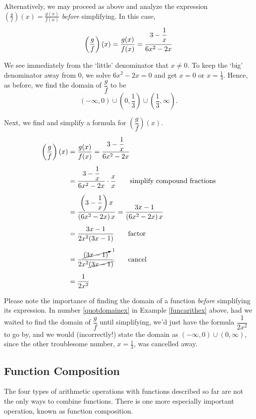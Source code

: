 {\begin{enumerate}
Alternatively, we may proceed as above and analyze the expression $\left(\frac{g}{f}\right)(x) = \frac{g(x)}{f(x)}$ \textit{before} simplifying.  In this case, \[ \left(\dfrac{g}{f}\right)(x) = \dfrac{g(x)}{f(x)}  = \dfrac{3-\dfrac{1}{x}\vphantom{\left(\dfrac{1}{x}\right)}}{6x^2 - 2x}\]

We see immediately from the `little' denominator that $x \neq 0$.  To keep the `big' denominator away from $0$, we solve $6x^2 - 2x = 0$ and get $x = 0$ or $x = \frac{1}{3}$.  Hence, as before, we find the domain of $\dfrac{g}{f}$ to be 
\[
(-\infty, 0) \cup \left(0, \frac{1}{3}\right) \cup \left(\frac{1}{3}, \infty\right).
\]

Next, we find and simplify a formula for $\left(\dfrac{g}{f}\right)(x)$.

\begin{align*} 
\left( \dfrac{g}{f}\right)(x) & = \dfrac{g(x)}{f(x)} = \dfrac{3-\dfrac{1}{x}}{6x^2 - 2x} \\[5pt]
& = \dfrac{3-\dfrac{1}{x}}{6x^2 - 2x} \cdot \dfrac{x}{x} \tag*{simplify compound fractions}  \\[5pt]
& = \dfrac{\left(3-\dfrac{1}{x}\right) x}{\left(6x^2 - 2x\right)x} = \dfrac{3x-1}{\left(6x^2 - 2x\right)x}  \\[5pt]
& = \dfrac{3x-1}{2x^2(3x-1)}  \tag*{factor} \\[5pt]
& = \dfrac{\cancelto{1}{(3x-1)}}{2x^2\cancel{(3x-1)}}  \tag*{cancel} \\[5pt]
& = \dfrac{1}{2x^2}  
\end{align*}
\end{enumerate}
}

\medskip

Please note the importance of finding the domain of a function \textit{before} simplifying its expression.  In number \ref{quotdomainex} in Example \ref{funcarithex} above, had we waited to find the domain of $\dfrac{g}{f}$ until  simplifying, we'd just have the formula $\dfrac{1}{2x^2}$ to go by, and we would (incorrectly!) state the domain as $(-\infty, 0) \cup (0,\infty)$, since the other troublesome number, $x = \frac{1}{3}$, was cancelled away.

\newpage

\subsection{Function Composition}

\label{FunctionComposition}

The four types of arithmetic operations with functions described so far are not the only ways to combine functions. There is one more especially important operation, known as function composition.

